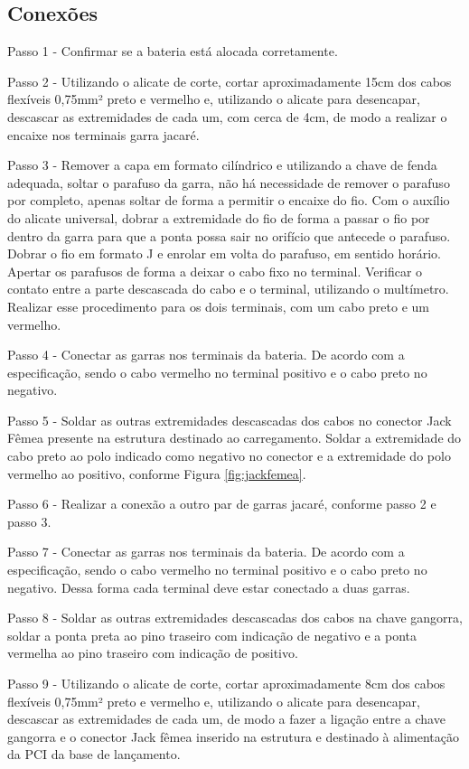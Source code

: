 \subsection*{Conexões}

Passo 1 - Confirmar se a bateria está alocada corretamente.

Passo 2 - Utilizando o alicate de corte, cortar aproximadamente 15cm dos cabos flexíveis 0,75mm² preto e vermelho e, utilizando o alicate para desencapar, descascar as extremidades de cada um, com cerca de 4cm, de modo a realizar o encaixe nos terminais garra jacaré.

Passo 3 - Remover a capa em formato cilíndrico e utilizando a chave de fenda adequada, soltar o parafuso da garra, não há necessidade de remover o parafuso por completo, apenas soltar de forma a permitir o encaixe do fio. Com o auxílio do alicate universal, dobrar a extremidade do fio de forma a passar o fio por dentro da garra para que a ponta possa sair no orifício que antecede o parafuso. Dobrar o fio em formato J e enrolar em volta do parafuso, em sentido horário. Apertar os parafusos de forma a deixar o cabo fixo no terminal. Verificar o contato entre a parte descascada do cabo e o terminal, utilizando o multímetro. Realizar esse procedimento para os dois terminais, com um cabo preto e um vermelho.

Passo 4 - Conectar as garras nos terminais da bateria. De acordo com a especificação, sendo o cabo vermelho no terminal positivo e o cabo preto no negativo.

Passo 5 - Soldar as outras extremidades descascadas dos cabos no conector Jack Fêmea presente na estrutura destinado ao carregamento. Soldar a extremidade do cabo preto ao polo indicado como negativo no conector e a extremidade do polo vermelho ao positivo, conforme Figura \ref{fig:jackfemea}.

Passo 6 - Realizar a conexão a outro par de garras jacaré, conforme passo 2 e passo 3.

Passo 7 - Conectar as garras nos terminais da bateria. De acordo com a especificação, sendo o cabo vermelho no terminal positivo e o cabo preto no negativo. Dessa forma cada terminal deve estar conectado a duas garras.

Passo 8 - Soldar as outras extremidades descascadas dos cabos na chave gangorra, soldar a ponta preta ao pino traseiro com indicação de negativo e a ponta vermelha ao pino traseiro com indicação de positivo.

Passo 9 - Utilizando o alicate de corte, cortar aproximadamente 8cm dos cabos flexíveis 0,75mm² preto e vermelho e, utilizando o alicate para desencapar, descascar as extremidades de cada um, de modo a fazer a ligação entre a chave gangorra e o conector Jack fêmea inserido na estrutura e destinado à alimentação da PCI da base de lançamento.

